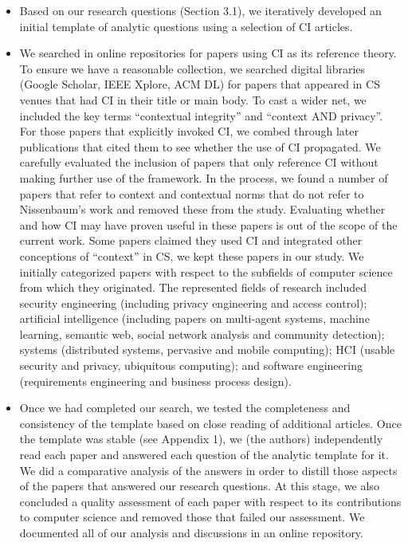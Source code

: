 \documentclass[../thesis.tex]{subfiles}
\newcommand\liststyleWWNumi{%
\renewcommand\labelitemi{${\bullet}$}
\renewcommand\labelitemii{${\circ}$}
\renewcommand\labelitemiii{${\blacksquare}$}
\renewcommand\labelitemiv{${\bullet}$}
}
\begin{document}
\liststyleWWNumi
\begin{itemize}
\item Based on our research questions (Section 3.1), we iteratively
developed an initial template of analytic questions using a selection
of CI articles. 
\item We searched in online repositories for papers using CI as its
reference theory. To ensure we have a reasonable collection, we
searched digital libraries (Google Scholar, IEEE Xplore, ACM DL) for
papers that appeared in CS venues that had CI in their title or main
body. To cast a wider net, we included the key terms
``contextual integrity'' and
``context AND privacy''. For those
papers that explicitly invoked CI, we combed through later publications
that cited them to see whether the use of CI propagated. We carefully
evaluated the inclusion of papers that only reference CI without making
further use of the framework. In the process, we found a number of
papers that refer to context and contextual norms that do not refer to
Nissenbaum's work and removed these from the study.
Evaluating whether and how CI may have proven useful in these papers is
out of the scope of the current work. Some papers claimed they used CI
and integrated other conceptions of
``context'' in CS, we kept these
papers in our study. We initially categorized papers with respect to
the subfields of computer science from which they originated. The
represented fields of research included security engineering (including
privacy engineering and access control); artificial intelligence
(including papers on multi-agent systems, machine learning, semantic
web, social network analysis and community detection); systems
(distributed systems, pervasive and mobile computing); HCI (usable
security and privacy, ubiquitous computing); and software engineering
(requirements engineering and business process design). 
\item Once we had completed our search, we tested the completeness and
consistency of the template based on close reading of additional
articles. Once the template was stable (see Appendix 1), we (the
authors) independently read each paper and answered each question of
the analytic template for it. We did a comparative analysis of the
answers in order to distill those aspects of the papers that answered
our research questions. At this stage, we also concluded a quality
assessment of each paper with respect to its contributions to computer
science and removed those that failed our assessment. We documented all
of our analysis and discussions in an online repository.

\end{itemize}
\end{document}
